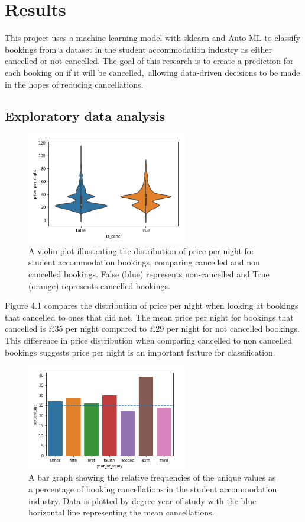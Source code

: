 \chapter{Results}
\label{ch:results}

This project uses a machine learning model with sklearn and Auto ML to classify bookings from a dataset in the student accommodation industry as either cancelled or not cancelled. The goal of this research is to create a prediction for each booking on if it will be cancelled, allowing data-driven decisions to be made in the hopes of reducing cancellations.
\section{Exploratory data analysis}
 \begin{figure}[H]
 \centering
 \includegraphics[width=7cm]{figures/price_per_night.png}
 \caption{A violin plot illustrating the distribution of price per night for student accommodation bookings, comparing cancelled and non cancelled bookings. False (blue) represents non-cancelled and True (orange)  represents cancelled bookings.}
\end{figure}
  
 Figure 4.1 compares the distribution of price per night when looking at bookings that cancelled to ones that did not. The mean price per night for bookings that cancelled is £35 per night compared to £29 per night for not cancelled bookings. This difference in price distribution when comparing cancelled to non cancelled bookings suggests price per night is an important feature for classification. 

 
 \begin{figure}[H]
 \centering
\includegraphics[width=7cm]{figures/yos.png}
 \caption{A bar graph showing the relative frequencies of the unique values as a percentage of booking cancellations in the student accommodation industry. Data is plotted by degree year of study with the blue horizontal line representing the mean cancellations.}
\end{figure}
  
